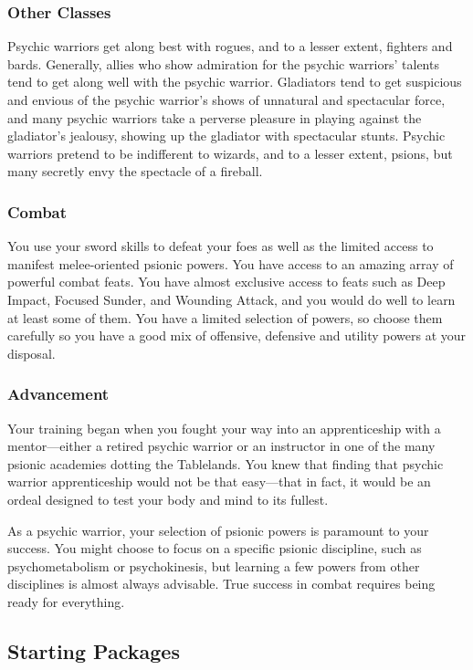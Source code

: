 \subsubsection{Other Classes}
Psychic warriors get along best with rogues, and to a lesser extent, fighters and bards. Generally, allies who show admiration for the psychic warriors' talents tend to get along well with the psychic warrior. Gladiators tend to get suspicious and envious of the psychic warrior's shows of unnatural and spectacular force, and many psychic warriors take a perverse pleasure in playing against the gladiator's jealousy, showing up the gladiator with spectacular stunts. Psychic warriors pretend to be indifferent to wizards, and to a lesser extent, psions, but many secretly envy the spectacle of a fireball.

\subsubsection{Combat}

You use your sword skills to defeat your foes as well as the limited access to manifest melee-oriented psionic powers. You have access to an amazing array of powerful combat feats. You have almost exclusive access to feats such as Deep Impact, Focused Sunder, and Wounding Attack, and you would do well to learn at least some of them. You have a limited selection of powers, so choose them carefully so you have a good mix of offensive, defensive and utility powers at your disposal.

\subsubsection{Advancement}
Your training began when you fought your way into an apprenticeship with a mentor---either a retired psychic warrior or an instructor in one of the many psionic academies dotting the Tablelands. You knew that finding that psychic warrior apprenticeship would not be that easy---that in fact, it would be an ordeal designed to test your body and mind to its fullest.

As a psychic warrior, your selection of psionic powers is paramount to your success. You might choose to focus on a specific psionic discipline, such as psychometabolism or psychokinesis, but learning a few powers from other disciplines is almost always advisable. True success in combat requires being ready for everything.

\subsection{Starting Packages}
